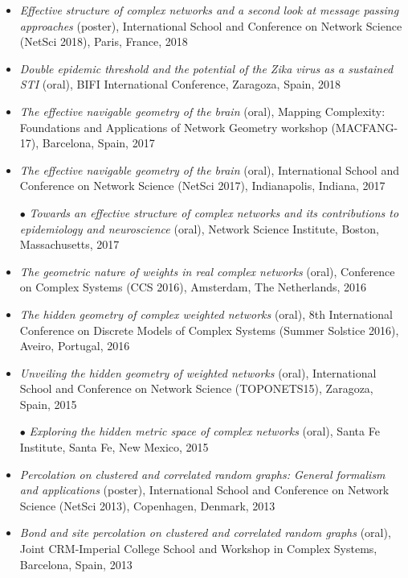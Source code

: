 \documentclass[11pt]{article}
\begin{document}
\begin{itemize}
%
  \item \textit{Effective structure of complex networks and a second look at message passing approaches} (poster), International School and Conference on Network Science (NetSci 2018), Paris, France, 2018
%
  \item \textit{Double epidemic threshold and the potential of the Zika virus as a sustained STI} (oral), BIFI International Conference, Zaragoza, Spain, 2018
%
  \item \textit{The effective navigable geometry of the brain} (oral), Mapping Complexity: Foundations and Applications of Network Geometry workshop (MACFANG-17), Barcelona, Spain, 2017
%
  \item \textit{The effective navigable geometry of the brain} (oral), International School and Conference on Network Science (NetSci 2017), Indianapolis, Indiana, 2017
%
  \item[$\bullet$] \textit{Towards an effective structure of complex networks and its contributions to epidemiology and neuroscience} (oral), Network Science Institute, Boston, Massachusetts, 2017
%
  \item \textit{The geometric nature of weights in real complex networks} (oral), Conference on Complex Systems (CCS 2016), Amsterdam, The Netherlands, 2016
%
  \item \textit{The hidden geometry of complex weighted networks} (oral), 8th International Conference on Discrete Models of Complex Systems (Summer Solstice 2016), Aveiro, Portugal, 2016
%
  \item \textit{Unveiling the hidden geometry of weighted networks} (oral), International School and Conference on Network Science (TOPONETS15), Zaragoza, Spain, 2015
%
  \item[$\bullet$] \textit{Exploring the hidden metric space of complex networks} (oral), Santa Fe Institute, Santa Fe, New Mexico, 2015
%
  \item \textit{Percolation on clustered and correlated random graphs: General formalism and applications} (poster), International School and Conference on Network Science (NetSci 2013), Copenhagen, Denmark, 2013
%
  \item \textit{Bond and site percolation on clustered and correlated random graphs} (oral), Joint CRM-Imperial College School and Workshop in Complex Systems, Barcelona, Spain, 2013

\end{itemize}
\end{document}
